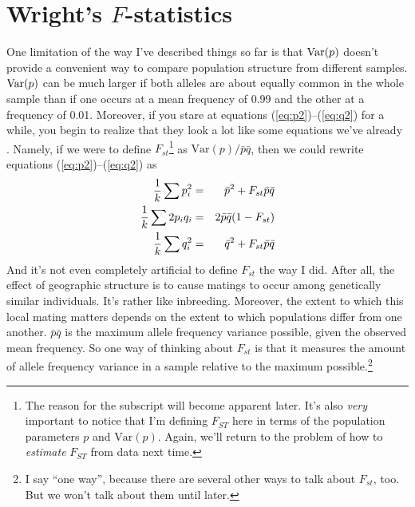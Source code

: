 \section*{Wright's $F$-statistics}

One limitation of the way I've described things so far is that
$\hbox{Var}(p)$ doesn't provide a convenient way to compare population
structure from different samples. $\hbox{Var}(p)$ can be much larger
if both alleles are about equally common in the whole sample than if
one occurs at a mean frequency of 0.99 and the other at a frequency of
0.01. Moreover, if you stare at equations (\ref{eq:p2})--(\ref{eq:q2})
for a while, you begin to realize that they look a lot like some
equations we've already
.
Namely, if we were to define $F_{st}$\footnote{The reason for the
  subscript will become apparent later. It's also {\it very\/}
  important to notice that I'm defining $F_{ST}$ here in terms of the
  population parameters $p$ and $\mbox{Var}(p)$. Again, we'll return
  to the problem of how to {\it estimate\/} $F_{ST}$ from data next
  time.} as $\mbox{Var}(p)/\bar p\bar q$, then we could rewrite
equations (\ref{eq:p2})--(\ref{eq:q2}) as
\begin{eqnarray}
\frac{1}{k}\sum p_i^2 &=& \bar p^2 + F_{st}\bar p \bar q \label{eq:p2-f} \\
\frac{1}{k}\sum 2p_iq_i &=& 2\bar p\bar q(1 - F_{st}) \label{eq:2pq-f} \\
\frac{1}{k}\sum q_i^2   &=& \bar q^2 + F_{st}\bar p \bar q \label{eq:q2-f}
\end{eqnarray}
And it's not even completely artificial to define $F_{st}$ the way I
did. After all, the effect of geographic structure is to cause matings
to occur among genetically similar individuals. It's rather like
inbreeding. Moreover, the extent to which this local mating matters
depends on the extent to which populations differ from one
another. $\bar p\bar q$ is the maximum allele frequency variance
possible, given the observed mean frequency. So one way of thinking
about $F_{st}$ is that it measures the amount of allele frequency
variance in a sample relative to the maximum possible.\footnote{I say
  ``one way'', because there are several other ways to talk about
  $F_{st}$, too. But we won't talk about them until later.}

